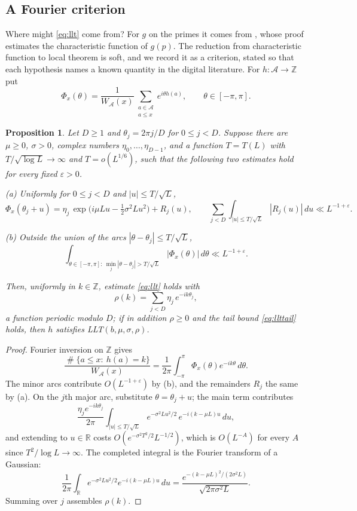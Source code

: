 \documentclass[11pt,reqno]{amsart}
\theoremstyle{plain}
\newtheorem{proposition}[theorem]{Proposition}
\theoremstyle{definition}
\newcommand{\Z}{\mathbb{Z}}
\newcommand{\R}{\mathbb{R}}
\DeclareMathOperator{\Card}{\#}
\begin{document}
\subsection{A Fourier criterion}
Where might \eqref{eq:llt} come from? For $g$ on the primes it comes from \cite{mmr2019}, whose proof estimates the characteristic function of $g(p)$. The reduction from characteristic function to local theorem is soft, and we record it as a criterion, stated so that each hypothesis names a known quantity in the digital literature. For $h\colon\mathcal A\to\Z$ put
\[
\Phi_x(\theta)=\frac1{W_{\mathcal A}(x)}\sum_{\substack{a\in\mathcal A\\ a\le x}}e^{i\theta h(a)},
\qquad \theta\in[-\pi,\pi].
\]

\begin{proposition}\label{prop:fourier}
Let $D\ge1$ and $\theta_j=2\pi j/D$ for $0\le j<D$. Suppose there are $\mu\ge0$, $\sigma>0$, complex numbers $\eta_0,\dots,\eta_{D-1}$, and a function $T=T(L)$ with $T/\sqrt{\log L}\to\infty$ and $T=o(L^{1/6})$, such that the following two estimates hold for every fixed $\varepsilon>0$.

(a) Uniformly for $0\le j<D$ and $|u|\le T/\sqrt L$,
\[
\Phi_x(\theta_j+u)=\eta_j\,\exp\Big(i\mu Lu-\tfrac12\sigma^{2}Lu^{2}\Big)+R_j(u),
\qquad
\sum_{j<D}\int_{|u|\le T/\sqrt L}|R_j(u)|\,du\ll L^{-1+\varepsilon}.
\]

(b) Outside the union of the arcs $|\theta-\theta_j|\le T/\sqrt L$,
\[
\int_{\theta\in[-\pi,\pi]:\ \min_j|\theta-\theta_j|>T/\sqrt L}|\Phi_x(\theta)|\,d\theta\ll L^{-1+\varepsilon}.
\]

Then, uniformly in $k\in\Z$, estimate \eqref{eq:llt} holds with
\[
\rho(k)=\sum_{j<D}\eta_j\,e^{-ik\theta_j},
\]
a function periodic modulo $D$; if in addition $\rho\ge0$ and the tail bound \eqref{eq:llttail} holds, then $h$ satisfies LLT$(b,\mu,\sigma,\rho)$.
\end{proposition}

\begin{proof}
Fourier inversion on $\Z$ gives
\[
\frac{\Card\{a\le x:\ h(a)=k\}}{W_{\mathcal A}(x)}
=\frac1{2\pi}\int_{-\pi}^{\pi}\Phi_x(\theta)e^{-ik\theta}\,d\theta .
\]
The minor arcs contribute $O(L^{-1+\varepsilon})$ by (b), and the remainders $R_j$ the same by (a). On the $j$th major arc, substitute $\theta=\theta_j+u$; the main term contributes
\[
\frac{\eta_je^{-ik\theta_j}}{2\pi}\int_{|u|\le T/\sqrt L}e^{-\sigma^{2}Lu^{2}/2}\,e^{-i(k-\mu L)u}\,du,
\]
and extending to $u\in\R$ costs $O(e^{-\sigma^{2}T^{2}/2}L^{-1/2})$, which is $O(L^{-A})$ for every $A$ since $T^{2}/\log L\to\infty$. The completed integral is the Fourier transform of a Gaussian:
\[
\frac1{2\pi}\int_{\R}e^{-\sigma^{2}Lu^{2}/2}e^{-i(k-\mu L)u}\,du
=\frac{e^{-(k-\mu L)^{2}/(2\sigma^{2}L)}}{\sqrt{2\pi\sigma^{2}L}} .
\]
Summing over $j$ assembles $\rho(k)$.
\end{proof}
\end{document}
